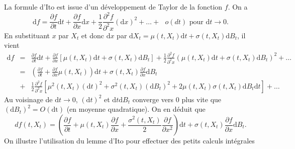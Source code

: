 La formule d'Ito est issue d'un développement de Taylor de la fonction $f$. On a 
$$
\text{d}f = \frac{\partial f}{\partial t}\text{d}t + \frac{\partial f}{\partial x}\text{d}x + \frac{1}{2}\frac{\partial^2 f}{\partial^2 x}(\text{d}x)^2+\ldots +\text{ }o(dt)\text{ pour }\text{d}t\rightarrow 0.
$$
En substituant $x$ par $X_t$ et donc $\text{d}x$ par $\text{d} X_t = \mu(t,X_t)\text{d}t + \sigma(t,X_t)\text{d}B_t$, il vient
\begin{eqnarray*}
\text{d}f & =& \frac{\partial f}{\partial t}\text{d}t + \frac{\partial f}{\partial x}\left[\mu(t,X_t)\text{d}t + \sigma(t,X_t)\text{d}B_t\right] + \frac{1}{2}\frac{\partial^2 f}{\partial^2 x}(\mu(t,X_t)\text{d}t + \sigma(t,X_t)\text{d}B_t)^2+\ldots\\
&=& \left(\frac{\partial f}{\partial t} + \frac{\partial f}{\partial x}\mu(t,X_t)\right)\text{d}t 
+ \sigma(t,X_t)\frac{\partial f}{\partial x}\text{d}B_t\\
 &+& \frac{1}{2}\frac{\partial^2 f}{\partial^2 x}\left[\mu^2(t,X_t)(\text{d}t)^2 + \sigma^2(t,X_t)(\text{d}B_t)^2 + 2 \mu(t,X_t)\sigma(t,X_t)\text{d}B_t\text{d}t  \right]+\ldots
\end{eqnarray*}
Au voisinage de $\text{d}t\rightarrow0$, $(\text{d}t)^2$ et $\text{d}t\text{d}B_t$ converge vers $0$ plus vite que $(\text{d}B_t)^2 = O(\text{dt})$ (en moyenne quadratique). On en déduit que 
$$
df(t,X_t) = \left(\frac{\partial f}{\partial t} + \mu(t,X_t)\frac{\partial f}{\partial x}+\frac{\sigma^2(t,X_t)}{2}\frac{\partial f}{\partial x^2}\right)\text{d}t + \sigma(t,X_t)\frac{\partial f}{\partial x}\text{d}B_t.
$$
On illustre l'utilisation du lemme d'Ito pour effectuer des petits calculs intégrales
